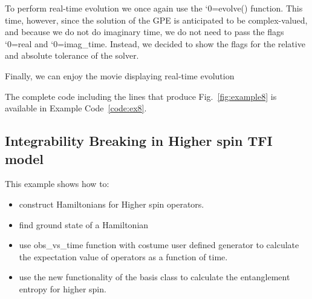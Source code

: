 \documentclass{SciPost}
\newcommand\0{\scalebox{-1}[1]{0}}
\let\svttfamily\ttfamily
\renewcommand\ttfamily{\svttfamily\catcode`0=\active }
\renewcommand\texttt{\bgroup\ttfamily\texttthelp}
\def\texttthelp#1{#1\egroup}
\newcommand{\GPcode}{example4.py}
\begin{document}

To perform real-time evolution we once again use the \texttt{evolve()} function. This time, however, since the solution of the GPE is anticipated to be complex-valued, and because we do not do imaginary time, we do not need to pass the flags \texttt{real} and \texttt{imag\_time}. Instead, we decided to show the flags for the relative and absolute tolerance of the solver. 

Finally, we can enjoy the movie displaying real-time evolution


The complete code including the lines that produce Fig.~\ref{fig:example8} is available in Example Code~\ref{code:ex8}.



\subsection{Integrability Breaking in Higher spin TFI model}

This example shows how to:
\begin{itemize}
	\item construct Hamiltonians for Higher spin operators.
	\item find ground state of a Hamiltonian
	\item use obs\_vs\_time function with costume user defined generator to calculate the expectation value of operators as a function of time.
	\item use the new functionality of the basis class to calculate the entanglement entropy for higher spin.
\end{itemize}
\end{document}
